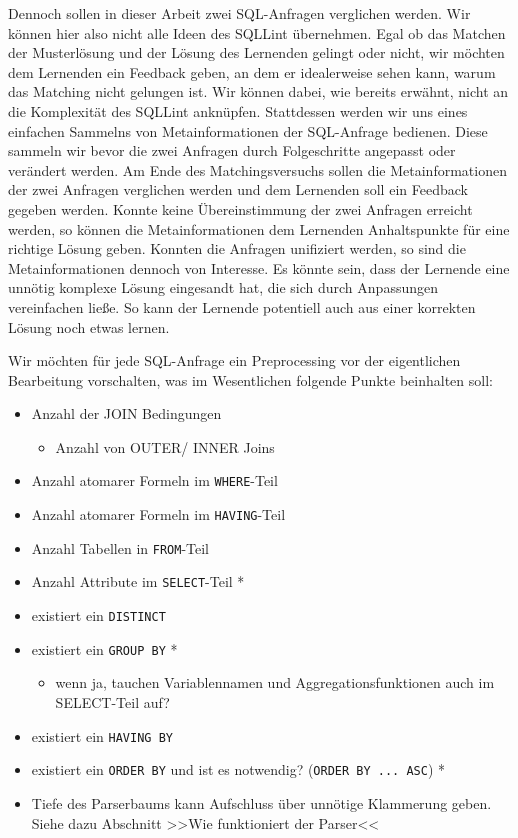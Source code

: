 Dennoch sollen in dieser Arbeit zwei SQL-Anfragen verglichen werden. Wir können hier also nicht alle Ideen des SQLLint übernehmen. Egal ob das Matchen der Musterlösung und der Lösung des Lernenden gelingt oder nicht, wir möchten dem Lernenden ein Feedback geben, an dem er idealerweise sehen kann, warum das Matching nicht gelungen ist. Wir können dabei, wie bereits erwähnt, nicht an die Komplexität des SQLLint anknüpfen. Stattdessen werden wir uns eines einfachen Sammelns von Metainformationen der SQL-Anfrage bedienen. Diese sammeln wir bevor die zwei Anfragen durch Folgeschritte angepasst oder verändert werden. Am Ende des Matchingsversuchs sollen die Metainformationen der zwei Anfragen verglichen werden und dem Lernenden soll ein Feedback gegeben werden. Konnte keine Übereinstimmung der zwei Anfragen erreicht werden, so können die Metainformationen dem Lernenden Anhaltspunkte für eine richtige Lösung geben. Konnten die Anfragen unifiziert werden, so sind die Metainformationen dennoch von Interesse. Es könnte sein, dass der Lernende eine unnötig komplexe Lösung eingesandt hat, die sich durch Anpassungen vereinfachen ließe. So kann der Lernende potentiell auch aus einer korrekten Lösung noch etwas lernen.

Wir möchten für jede SQL-Anfrage ein Preprocessing vor der eigentlichen Bearbeitung vorschalten, was im Wesentlichen folgende Punkte beinhalten soll:

\begin{itemize}
\item Anzahl der JOIN Bedingungen
	\begin{itemize}
	\item Anzahl von OUTER/ INNER Joins
	\end{itemize}
\item Anzahl atomarer Formeln im \verb|WHERE|-Teil
\item Anzahl atomarer Formeln im \verb|HAVING|-Teil
\item Anzahl Tabellen in \verb|FROM|-Teil
\item Anzahl Attribute im \verb|SELECT|-Teil *
\item existiert ein \verb|DISTINCT|
\item existiert ein \verb|GROUP BY| *
	\begin{itemize}
	\item wenn ja, tauchen Variablennamen und Aggregationsfunktionen auch im SELECT-Teil auf?
	\end{itemize}	 
\item existiert ein \verb|HAVING BY|
\item existiert ein \verb|ORDER BY| und ist es notwendig? (\verb|ORDER BY ... ASC|) *
\item Tiefe des Parserbaums kann Aufschluss über unnötige Klammerung geben. Siehe dazu Abschnitt >>Wie funktioniert der Parser<<
\end{itemize}

